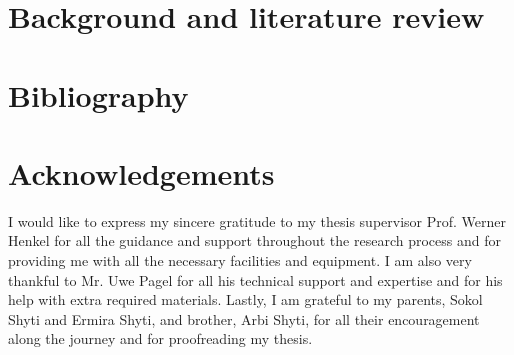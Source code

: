 \documentclass[a4paper,11pt,oneside]{article}
\begin{document}
  \newpage
  \section{Background and literature review}
  






  
  
  


  \newpage
  \section*{Bibliography}
  \printbibliography


  \newpage
  \section*{Acknowledgements}
  
  I would like to express my sincere gratitude to my thesis supervisor Prof. Werner Henkel for all the guidance and support throughout the research process and for providing me with all the necessary facilities and equipment. I am also very thankful to Mr. Uwe Pagel for all his technical support and expertise and for his help with extra required materials. Lastly, I am grateful to my parents, Sokol Shyti and Ermira Shyti, and brother, Arbi Shyti, for all their encouragement along the journey and for proofreading my thesis.  
\end{document}
